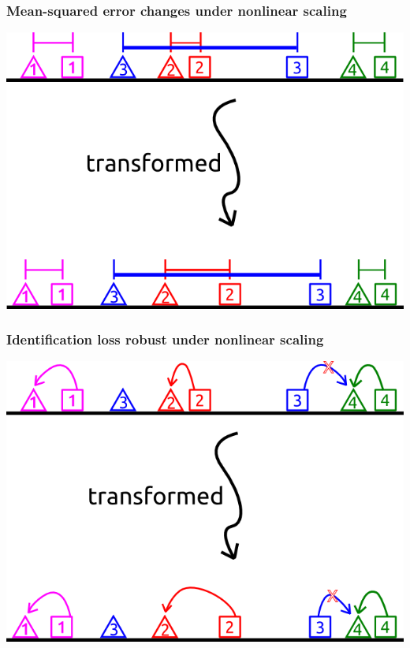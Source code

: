 \documentclass{beamer}
\begin{document}
\begin{frame}
\frametitle{Mean-squared error changes under nonlinear scaling}
\begin{center}
\includegraphics[scale = 0.5]{../diagram/idloss3a.png}
\end{center}
\end{frame}

\begin{frame}
\frametitle{Identification loss robust under nonlinear scaling}
\begin{center}
\includegraphics[scale = 0.5]{../diagram/idloss3b.png}
\end{center}
\end{frame}
\end{document}
